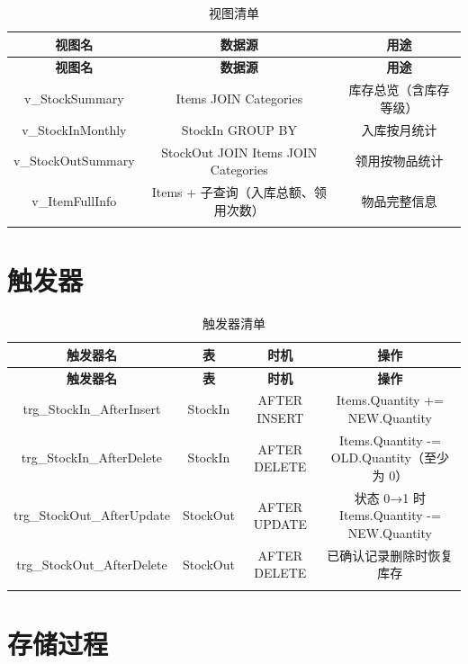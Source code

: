 \documentclass[12pt,a4paper]{ctexart}
\begin{document}
\begin{longtable}{c|c|c}
\toprule
\textbf{视图名} & \textbf{数据源} & \textbf{用途} \\
\midrule
\endfirsthead
\toprule
\textbf{视图名} & \textbf{数据源} & \textbf{用途} \\
\midrule
\endhead
v\_StockSummary     & Items JOIN Categories                    & 库存总览（含库存等级） \\
v\_StockInMonthly   & StockIn GROUP BY                          & 入库按月统计 \\
v\_StockOutSummary  & StockOut JOIN Items JOIN Categories       & 领用按物品统计 \\
v\_ItemFullInfo     & Items + 子查询（入库总额、领用次数）       & 物品完整信息 \\
\bottomrule
\caption{视图清单}
\end{longtable}

\section{触发器}

\begin{longtable}{c|c|c|c}
\toprule
\textbf{触发器名} & \textbf{表} & \textbf{时机} & \textbf{操作} \\
\midrule
\endfirsthead
\toprule
\textbf{触发器名} & \textbf{表} & \textbf{时机} & \textbf{操作} \\
\midrule
\endhead
trg\_StockIn\_AfterInsert  & StockIn  & AFTER INSERT  & Items.Quantity += NEW.Quantity \\
trg\_StockIn\_AfterDelete  & StockIn  & AFTER DELETE  & Items.Quantity -= OLD.Quantity（至少为 0） \\
trg\_StockOut\_AfterUpdate & StockOut & AFTER UPDATE  & 状态 0→1 时 Items.Quantity -= NEW.Quantity \\
trg\_StockOut\_AfterDelete & StockOut & AFTER DELETE  & 已确认记录删除时恢复库存 \\
\bottomrule
\caption{触发器清单}
\end{longtable}

\section{存储过程}
\end{document}
